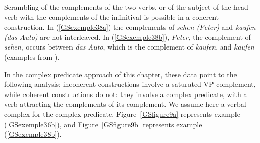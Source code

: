 \documentclass[output=paper
                ,modfonts
                ,nonflat
	        ,collection
	        ,collectionchapter
	        ,collectiontoclongg
 	        ,biblatex
                ,babelshorthands
                ,newtxmath
                ,draftmode
                ,colorlinks, citecolor=brown
]{./langsci/langscibook}
\begin{document}
{\begin{exe}
\begin{xlist}
		\label{GSexemple37d}	
		
		\label{GSexemple37e}
		
		\label{GSexemple37f}
		
		\label{GSexemple37g}
		
		\end{xlist}
\end{exe}

Scrambling of the complements of the two verbs, or of the subject of the head verb with the complements of the infinitival is possible in a coherent construction. In (\ref{GSexemple38a}) the complements of \textit{sehen (Peter)} and \textit{kaufen (das Auto)} are not interleaved. In (\ref{GSexemple38b}), \textit{Peter}, the complement of \textit{sehen}, occurs between \textit{das Auto}, which is the complement of \textit{kaufen}, and \textit{kaufen} (examples from \citealt{HN98a}).

\begin{exe}
	\ex \label{GSexemple38} 
	\begin{xlist}
        \label{GSexemple38a}

		\label{GSexemple38b}
		\end{xlist}
\end{exe}

In the complex predicate approach of this chapter, these data point to the following analysis: incoherent constructions involve a saturated VP complement, while coherent constructions do not: they involve a complex predicate, with a verb attracting the complements of its complement. We assume here a verbal complex for the complex predicate. Figure~\ref{GSfigure9a} represents example (\ref{GSexemple36b}), and Figure~\ref{GSfigure9b} represents example (\ref{GSexemple38b}).

}
\end{document}
